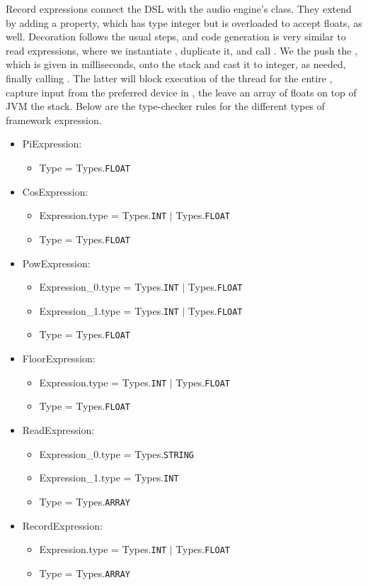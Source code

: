 Record expressions connect the DSL with the audio engine's  class. They extend  by adding a  property, which has type integer but is overloaded to accept floats, as well. Decoration follows the usual steps, and code generation is very similar to read expressions, where we instantiate , duplicate it, and call . We the push the , which is given in milliseconds, onto the stack and cast it to integer, as needed, finally calling . The latter will block execution of the  thread for the entire , capture input from the preferred device in , the leave an array of floats on top of JVM the stack. Below are the type-checker rules for the different types of framework expression.

\begin{itemize}
	\item PiExpression:
		\begin{itemize}
			\item Type = Types.\texttt{FLOAT}
		\end{itemize}
	\item CosExpression:
		\begin{itemize}
			\item Expression.type = Types.\texttt{INT} $|$ Types.\texttt{FLOAT}
			\item Type = Types.\texttt{FLOAT}
		\end{itemize}
	\item PowExpression:
		\begin{itemize}
			\item Expression\_0.type = Types.\texttt{INT} $|$ Types.\texttt{FLOAT}
			\item Expression\_1.type = Types.\texttt{INT} $|$ Types.\texttt{FLOAT}
			\item Type = Types.\texttt{FLOAT}
		\end{itemize}
	\item FloorExpression:
		\begin{itemize}
			\item Expression.type = Types.\texttt{INT} $|$ Types.\texttt{FLOAT}
			\item Type = Types.\texttt{FLOAT}
		\end{itemize}
	\item ReadExpression:
		\begin{itemize}
			\item Expression\_0.type = Types.\texttt{STRING}
			\item Expression\_1.type = Types.\texttt{INT}
			\item Type = Types.\texttt{ARRAY}
		\end{itemize}
	\item RecordExpression:
		\begin{itemize}
			\item Expression.type = Types.\texttt{INT} $|$ Types.\texttt{FLOAT}
			\item Type = Types.\texttt{ARRAY}
		\end{itemize}
\end{itemize}

